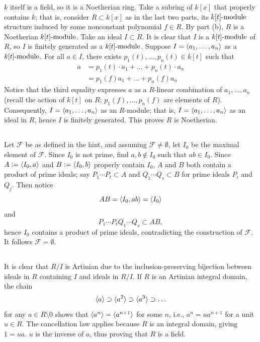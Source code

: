 \documentclass[12pt]{article}
\begin{document}
\subsubsection{} 
$k$ itself is a field, so it is a Noetherian ring. 
Take a subring of $k[x]$ that properly contains $k$; 
that is, consider $R \subset k[x]$ as in the last two parts, its $k[t]\text{-module}$ structure induced by some nonconstant polynomial $f \in R$. 
By part (b), $R$ is a Noetherian $k[t]\text{-module}$. 
Take an ideal $I \subset R$. 
It is clear that $I$ is a $k[t]\text{-module}$ of $R$, so $I$ is finitely generated as a $k[t]\text{-module}$. 
Suppose $I = \langle a_1, \ldots, a_n\rangle$ as a $k[t]\text{-module}$. 
For all $a \in I$, there exists $p_1(t), \ldots, p_n(t) \in k[t]$ such that 
\begin{align*} 
  a & = p_1(t) \cdot a_1 + \ldots + p_n(t) \cdot a_n \\ 
    & = p_1(f)a_1 + \ldots + p_n(f)a_n
\end{align*}
Notice that the third equality expresses $a$ as a $R$-linear combination of $a_1, \ldots, a_n$ (recall the action of $k[t]$ on $R$; $p_1(f), \ldots, p_n(f)$ are elements of $R$). 
Consequently, $I = \langle a_1, \ldots, a_n\rangle$ as an $R$-module; 
that is, $I = \langle a_1, \ldots, a_n\rangle$ as an ideal in $R$, hence $I$ is finitely generated. 
This proves $R$ is Noetherian. 

\setcounter{subsection}{7}
\subsection{} 
Let $\mathscr{F}$ be as defined in the hint, and assuming $\mathscr{F} \neq \emptyset$, let $I_0$ be the maximal element of $\mathscr{F}$. 
Since $I_0$ is not prime, find $a, b \notin I_0$ such that $ab \in I_0$. 
Since $A \vcentcolon= \langle I_0, a\rangle$ and $B \vcentcolon= \langle I_0, b\rangle$ properly contain $I_0$, $A$ and $B$ both contain a product of prime ideals; 
say $P_1 \cdots P_t \subset A$ and $Q_1 \cdots Q_s \subset B$ for prime ideals $P_i$ and $Q_j$. 
Then notice 
$$AB = \langle I_0, ab\rangle = \langle I_0\rangle$$ 
and 
$$P_1 \cdots P_t Q_1 \cdots Q_s \subset AB,$$
hence $I_0$ contains a product of prime ideals, contradicting the construction of $\mathscr{F}$. 
It follows $\mathscr{F} = \emptyset$.

\setcounter{subsection}{9}
\subsection{} 
It is clear that $R / I$ is Artinian due to the inclusion-preserving bijection between ideals in $R$ containing $I$ and ideals in $R / I$. 
If $R$ is an Artinian integral domain, the chain 
$$\langle a\rangle \supset \langle a^2\rangle \supset \langle a^3\rangle \supset \ldots$$ 
for any $a \in R \setminus 0$ shows that $\langle a^n\rangle = \langle a^{n + 1}\rangle$ for some $n$, 
i.e., $a^n = u a^{n + 1}$ for a unit $u \in R$. 
The cancellation law applies because $R$ is an integral domain, giving $1 = ua$.
$u$ is the inverse of $a$, thus proving that $R$ is a field. 
\end{document}
